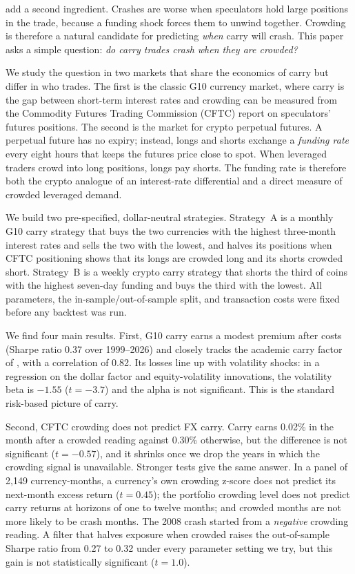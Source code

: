 \documentclass[11pt]{article}
\begin{document}
\citet{BrunnermeierNagelPedersen2008} add a second ingredient. Crashes are worse when speculators hold large positions in the trade, because a funding shock forces them to unwind together. Crowding is therefore a natural candidate for predicting \emph{when} carry will crash. This paper asks a simple question: \emph{do carry trades crash when they are crowded?}

We study the question in two markets that share the economics of carry but differ in who trades. The first is the classic G10 currency market, where carry is the gap between short-term interest rates and crowding can be measured from the Commodity Futures Trading Commission (CFTC) report on speculators' futures positions. The second is the market for crypto perpetual futures. A perpetual future has no expiry; instead, longs and shorts exchange a \emph{funding rate} every eight hours that keeps the futures price close to spot. When leveraged traders crowd into long positions, longs pay shorts. The funding rate is therefore both the crypto analogue of an interest-rate differential and a direct measure of crowded leveraged demand.

We build two pre-specified, dollar-neutral strategies. Strategy~A is a monthly G10 carry strategy that buys the two currencies with the highest three-month interest rates and sells the two with the lowest, and halves its positions when CFTC positioning shows that its longs are crowded long and its shorts crowded short. Strategy~B is a weekly crypto carry strategy that shorts the third of coins with the highest seven-day funding and buys the third with the lowest. All parameters, the in-sample/out-of-sample split, and transaction costs were fixed before any backtest was run.

We find four main results. First, G10 carry earns a modest premium after costs (Sharpe ratio 0.37 over 1999--2026) and closely tracks the academic carry factor of \citet{LRV2011}, with a correlation of 0.82. Its losses line up with volatility shocks: in a regression on the dollar factor and equity-volatility innovations, the volatility beta is $-1.55$ ($t=-3.7$) and the alpha is not significant. This is the standard risk-based picture of carry.

Second, CFTC crowding does not predict FX carry. Carry earns 0.02\% in the month after a crowded reading against 0.30\% otherwise, but the difference is not significant ($t=-0.57$), and it shrinks once we drop the years in which the crowding signal is unavailable. Stronger tests give the same answer. In a panel of 2,149 currency-months, a currency's own crowding z-score does not predict its next-month excess return ($t=0.45$); the portfolio crowding level does not predict carry returns at horizons of one to twelve months; and crowded months are not more likely to be crash months. The 2008 crash started from a \emph{negative} crowding reading. A filter that halves exposure when crowded raises the out-of-sample Sharpe ratio from 0.27 to 0.32 under every parameter setting we try, but this gain is not statistically significant ($t=1.0$).
\end{document}
